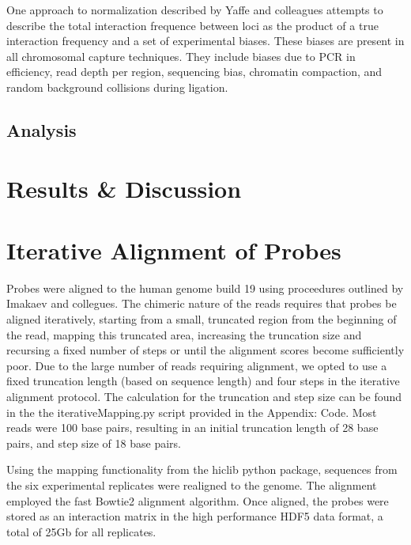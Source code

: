 \documentclass[phd,tocprelim]{cornell}
\begin{document}
One approach to normalization described by Yaffe and colleagues\cite{yaffe2011}
attempts to describe the total interaction frequence between loci as the product
of a true interaction frequency and a set of experimental biases.  These biases
are present in all chromosomal capture techniques.  They include biases due to
PCR in efficiency, read depth per region, sequencing bias, chromatin compaction,
and random background collisions during
ligation\cite{benner2014}\cite{dekker2006}.




\section{Analysis}






\chapter{Results \& Discussion}


%
%

\appendix
\appendixpage
\addappheadtotoc
\chapter{Iterative Alignment of Probes}

Probes were aligned to the human genome build 19 using proceedures outlined by
Imakaev and collegues\cite{imakaev2013}.  The chimeric nature of the reads
requires that probes be aligned iteratively, starting from a small, truncated
region from the beginning of the read, mapping this truncated area, increasing
the truncation size and recursing a fixed number of steps or until the alignment
scores become sufficiently poor.  Due to the large number of reads requiring
alignment, we opted to use a fixed truncation length (based on sequence length)
and four steps in the iterative alignment protocol.  The calculation
for the truncation and step size can be found in the the iterativeMapping.py
script provided in the Appendix: Code.  Most reads were 100 base pairs, resulting
in an initial truncation length of 28 base pairs, and step size of 18 base pairs.

Using the mapping functionality from the hiclib python package\cite{imakaev2013},
sequences from the six experimental replicates were realigned to the genome.  The
alignment employed the fast Bowtie2 alignment algorithm\cite{langmead2012}.  Once
aligned, the probes were stored as an interaction matrix in the high performance
HDF5\cite{hdf5} data format, a total of 25Gb for all replicates.
\end{document}

